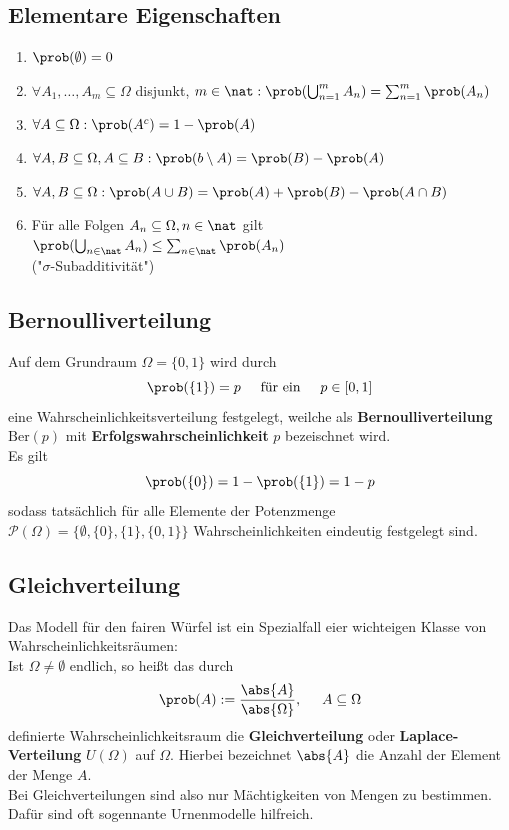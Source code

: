 \documentclass{kit}
\begin{document}
  \subsection{Elementare Eigenschaften}
  \begin{enumerate}[label=\roman*)]
      \item $\prob(\emptyset)=0$
      \item $\forall A_1,\dots,A_m\subseteq\Omega$ disjunkt, $m\in\nat:\prob(\bigcup^m_{n=1}A_n)=\sum^m_{n=1}\prob(A_n)$
      \item $\forall A\subseteq\Omega: \prob(A^c)=1-\prob(A)$
      \item $\forall A,B\subseteq\Omega,A\subseteq B:\prob(b\setminus A)=\prob(B)-\prob(A)$
      \item $\forall A,B\subseteq\Omega:\prob(A\cup B)=\prob(A)+\prob(B)-\prob(A\cap B)$
      \item Für alle Folgen $A_n\subseteq\Omega,n\in\nat$ gilt $\prob(\bigcup_{n\in\nat}A_n)\le\sum_{n\in\nat}\prob(A_n)$ \\
        ("$\sigma$-Subadditivität")
    \end{enumerate}
  \subsection{Bernoulliverteilung}
    Auf dem Grundraum $\Omega=\{0,1\}$ wird durch
    $$\prob(\{1\})=p\hspace{0.5cm}\text{für ein}\hspace{0.5cm}p\in[0,1]$$
    eine Wahrscheinlichkeitsverteilung festgelegt, weilche als \textbf{Bernoulliverteilung} $\text{Ber}(p)$ mit 
    \textbf{Erfolgswahrscheinlichkeit} $p$ bezeischnet wird.\\
    Es gilt
    $$\prob(\{0\})=1-\prob(\{1\})=1-p$$
    sodass tatsächlich für alle Elemente der Potenzmenge $\mathscr{P}(\Omega)=\{\emptyset,\{0\},\{1\},\{0,1\}\}$
    Wahrscheinlichkeiten eindeutig festgelegt sind.
  \subsection{Gleichverteilung}
    Das Modell für den fairen Würfel ist ein Spezialfall eier wichteigen Klasse von Wahrscheinlichkeitsräumen:\\
    Ist $\Omega\neq\emptyset$ endlich, so heißt das durch
    $$\prob(A):=\frac{\abs{A}}{\abs{\Omega}},\hspace{0.5cm}A\subseteq\Omega$$
    definierte Wahrscheinlichkeitsraum die \textbf{Gleichverteilung} oder \textbf{Laplace-Verteilung} $U(\Omega)$ auf
    $\Omega$. Hierbei bezeichnet $\abs{A}$ die Anzahl der Element der Menge $A$.\\
    Bei Gleichverteilungen sind also nur Mächtigkeiten von Mengen zu bestimmen. Dafür sind oft sogennante Urnenmodelle
    hilfreich.
\end{document}
